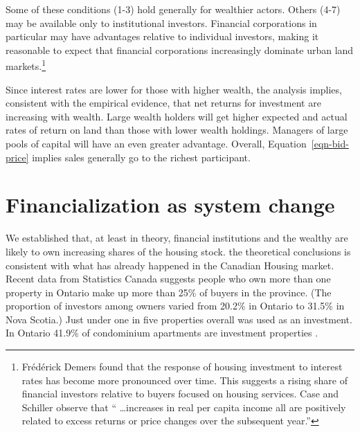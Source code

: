 Some  of these conditions (1-3) hold generally for wealthier actors. Others (4-7) may be available only to institutional investors.  Financial corporations in particular may have advantages relative to individual investors, making it  reasonable to expect that financial corporations increasingly dominate urban land 
markets.\footnote{Fr\'ed\'erick Demers \cite{demersModellingForecastingHousing2005} found that the response of housing investment to interest rates has become more pronounced over time. This suggests a rising share of financial investors relative to buyers focused on housing services. Case and Schiller \cite{caseThereBubbleHousing2003} observe that `` \dots increases in real per capita income all are positively related to excess returns or price changes over the subsequent year.''}  

Since interest rates are lower for those with higher wealth, the analysis implies, consistent with the empirical evidence, that net returns for investment are increasing with wealth. Large wealth holders will get higher expected and actual rates of return on land than those with lower wealth holdings. Managers of large pools of capital will have an even greater   advantage. Overall, Equation~\ref{eqn-bid-price} implies  sales generally go to the richest participant.
 




\section{Financialization as system change} \label{section-system}
We established that, at least in theory,  financial institutions and the wealthy are likely to own increasing shares of the housing stock. the theoretical conclusions is consistent with what has already happened in the Canadian Housing market. Recent data from Statistics Canada \cite{fontaineResidentialRealEstate2023} suggests people who own more than one property in Ontario make up more than 25\% of buyers in the province. (The proportion of investors among owners varied from 20.2\% in Ontario to 31.5\% in Nova Scotia.)
Just under one in five properties overall was used as an investment.
In Ontario 41.9\% of condominium apartments are investment properties \cite{statisticscanadaBuyRentHousing2022}.

